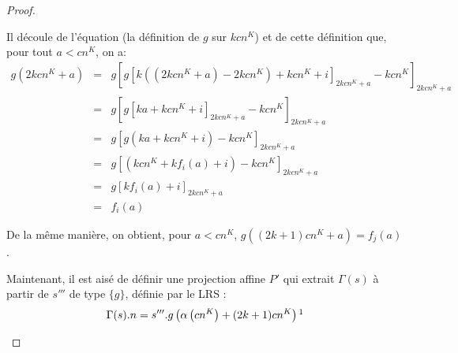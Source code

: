 \documentclass{report}
\begin{document}
\begin{proof}
\begin{enumerate}[itemsep=-1mm,leftmargin=2cm]
					Il découle de l'équation \redtext{$(\star)$} (la définition de $g$ sur $kcn^K$) et de cette définition que, pour tout $a < cn^K$, on a\footnotemark :
					\setcounter{equation}{0}
					\begin{eqnarray}
						g\left( 2kcn^K + a\right)	& = & 		g\left[ g\left[ k\left( \left(2kcn^K + a\right) - 2kcn^K \right) + kcn^K  + i\right]_{2kcn^K + a} - kcn^K  \right]_{2kcn^K + a} \\
													& = & 		g\left[ g\left[ k a + kcn^K  + i\right]_{2kcn^K + a} - kcn^K  \right]_{2kcn^K + a} \\
													& = & 		g\left[ g\left( k a + kcn^K  + i\right) - kcn^K  \right]_{2kcn^K + a} \\
													& = & 		g\left[ \left(kcn^K  +  k f_i(a) + i\right) - kcn^K  \right]_{2kcn^K + a} \\
													& = & 		g\left[ k f_i(a) + i \right]_{2kcn^K + a} \\
													& = & 		f_i(a)
					\end{eqnarray}
					
					De la même manière, on obtient, pour $a < cn^K$, $g\left( (2k+1)cn^K + a\right) = f_j(a)$. 
					
					Maintenant, il est aisé de définir une projection affine $P'$ qui extrait $\Gamma(s)$ à partir de $s'''$ de type $\{g\}$, définie par le LRS :
					\[
						\Gamma(s).n = s'''.g\left( \alpha\left( cn^K\right) + (2k+1)cn^K\right) \footnotemark
					\]
					
					

\end{enumerate}
\end{proof}
\end{document}
